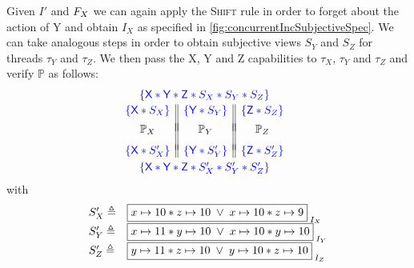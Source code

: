 Given $I'$ and $F_{X}$ we can again apply the \textsc{Shift} rule in order to forget about the action of \textsf{Y} and obtain $I_X$ as specified in \fig\ref{fig:concurrentIncSubjectiveSpec}. We can take analogous steps in order to obtain subjective views $S_Y$ and $S_Z$ for threads $\tau_Y$ and $\tau_Z$. We then pass the \textsf{X}, \textsf{Y} and \textsf{Z} capabilities to $\tau_X$, $\tau_Y$ and $\tau_Z$ and verify $\mathbb{P}$ as follows:
%
\[
\hspace*{-0.2cm}
\begin{array}{c}
	\color{blue}{\left\{\textsf{X} * \textsf{Y} *  \textsf{Z} *  S_X * S_Y * S_Z \right\}}\vspace*{2pt}\\
	
	\begin{array}{c || c || c}
		\color{blue}{\left\{\textsf{X} * S_X \right\}} & \color{blue}{\left\{\textsf{Y} * S_Y \right\}} & \color{blue}{\left\{\textsf{Z} * S_Z \right\}}\\
		&&\vspace*{-7pt}\\
		\mathbb{P}_X & \mathbb{P}_Y & \mathbb{P}_Z\\
		&&\vspace*{-5pt}\\

		\color{blue}{
			\left\{
					\textsf{X} * S'_X
			\right\}
		} 
		& 
		\color{blue}{
			\left\{
				\textsf{Y} * S'_Y
			\right\}
		} 

		&
		
		\color{blue}{
			\left\{
				\textsf{Z} * S'_Z
			\right\}
		} 		
		\vspace*{3pt}
	\end{array}\\
	\color{blue}{\left\{\textsf{X} * \textsf{Y} *  \textsf{Z} *  S'_X * S'_Y * S'_Z \right\}}\\
\end{array}
\]
%
with
%
\[
\begin{array}{l l}
	S'_X \eqdef & \shared{\cell{x}{10} * \cell{z}{10} \;\lor\; \cell{x}{10} * \cell{z}{9} }{I_X}\\
	S'_Y \eqdef & \shared{\cell{x}{11} * \cell{y}{10} \;\lor\; \cell{x}{10} * \cell{y}{10} }{I_Y}\\
	S'_Z \eqdef & \shared{\cell{y}{11} * \cell{z}{10} \;\lor\; \cell{y}{10} * \cell{z}{10} }{I_Z}
\end{array}
\]
%
%
